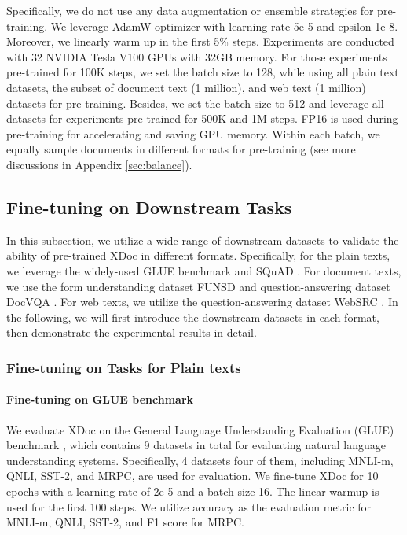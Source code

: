 \documentclass[11pt]{article}
\begin{document}
Specifically, we do not use any data augmentation or ensemble strategies for pre-training. We leverage AdamW optimizer \cite{loshchilov2017decoupled} with learning rate 5e-5 and epsilon 1e-8. Moreover, we linearly warm up in the first 5\% steps. Experiments are conducted with 32 NVIDIA Tesla V100 GPUs with 32GB memory. For those experiments pre-trained for 100K steps, we set the batch size to 128, while using all plain text datasets, the subset of document text (1 million), and web text (1 million) datasets for pre-training. Besides, we set the batch size to 512 and leverage all datasets for experiments pre-trained for 500K and 1M steps. FP16 is used during pre-training for accelerating and saving GPU memory. Within each batch, we equally sample documents in different formats for pre-training (see more 
discussions in Appendix \ref{sec:balance}).


\subsection{Fine-tuning on Downstream Tasks}
In this subsection, we utilize a wide range of downstream datasets to validate the ability of pre-trained XDoc in different formats. Specifically, for the plain texts, we leverage the widely-used GLUE benchmark \cite{wang2018glue} and SQuAD \cite{rajpurkar2016squad,rajpurkar2018know}. For document texts, we use the form understanding dataset FUNSD \cite{jaume2019funsd} and question-answering dataset DocVQA \cite{mathew2021docvqa}. For web texts, we utilize the question-answering dataset WebSRC \cite{chen2021websrc}.  
In the following, we will first introduce the downstream datasets in each format, then demonstrate the experimental results in detail.



\subsubsection{Fine-tuning on Tasks for Plain texts}
\paragraph{Fine-tuning on GLUE benchmark}
We evaluate XDoc on the General Language Understanding Evaluation (GLUE) benchmark \cite{wang2018glue}, which contains 9 datasets in total for evaluating natural language understanding systems. Specifically, 4 datasets four of them, including MNLI-m, QNLI, SST-2, and MRPC, are used for evaluation. We fine-tune XDoc for 10 epochs with a learning rate of 2e-5 and a batch size 16. The linear warmup is used for the first 100 steps. We utilize accuracy as the evaluation metric for MNLI-m, QNLI, SST-2, and F1 score for MRPC.
\end{document}
